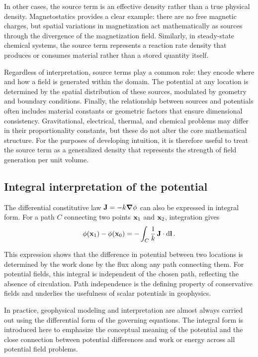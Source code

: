 In other cases, the source term is an effective density rather than a true physical density. Magnetostatics provides a clear example: there are no free magnetic charges, but spatial variations in magnetization act mathematically as sources through the divergence of the magnetization field. Similarly, in steady-state chemical systems, the source term represents a reaction rate density that produces or consumes material rather than a stored quantity itself.

Regardless of interpretation, source terms play a common role: they encode where and how a field is generated within the domain. The potential at any location is determined by the spatial distribution of these sources, modulated by geometry and boundary conditions.  Finally, the relationship between sources and potentials often includes material constants or geometric factors that ensure dimensional consistency. Gravitational, electrical, thermal, and chemical problems may differ in their proportionality constants, but these do not alter the core mathematical structure. For the purposes of developing intuition, it is therefore useful to treat the source term as a generalized density that represents the strength of field generation per unit volume.


\subsection{Integral interpretation of the potential}

The differential constitutive law $\vb{J} = -k\grad{\phi}$ can also be expressed in integral form. For a path $C$ connecting two points $\vb{x}_1$ and $\vb{x}_2$, integration gives
\[
    \phi(\vb{x}_1) - \phi(\vb{x}_0) =
    -\int_C \frac{1}{k}\,\vb{J}\cdot \dd{\vb{l}}.
\]

This expression shows that the difference in potential between two locations is determined by the work done by the flux along any path connecting them. For potential fields, this integral is independent of the chosen path, reflecting the absence of circulation. Path independence is the defining property of conservative fields and underlies the usefulness of scalar potentials in geophysics.

In practice, geophysical modeling and interpretation are almost always carried out using the differential form of the governing equations. The integral form is introduced here to emphasize the conceptual meaning of the potential and the close connection between potential differences and work or energy across all potential field problems.

